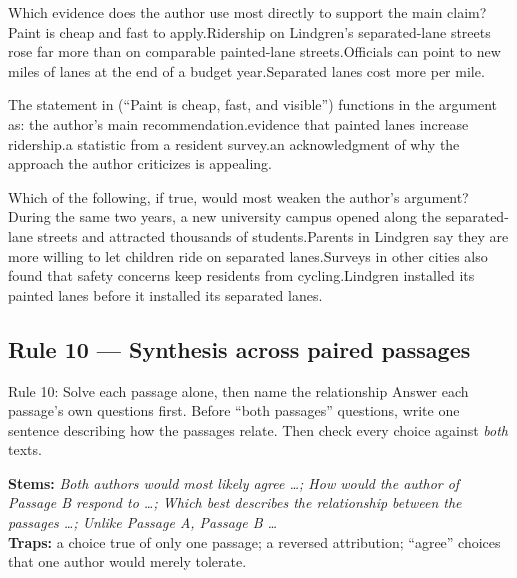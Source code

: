 \documentclass[11pt]{article}
\begin{document}
{Which evidence does the author use most directly to support the main claim?}
{Paint is cheap and fast to apply.}{Ridership on Lindgren's separated-lane streets rose far more than on comparable painted-lane streets.}{Officials can point to new miles of lanes at the end of a budget year.}{Separated lanes cost more per mile.}

{The statement in  (``Paint is cheap, fast, and visible'') functions in the argument as:}
{the author's main recommendation.}{evidence that painted lanes increase ridership.}{a statistic from a resident survey.}{an acknowledgment of why the approach the author criticizes is appealing.}

{Which of the following, if true, would most weaken the author's argument?}
{During the same two years, a new university campus opened along the separated-lane streets and attracted thousands of students.}{Parents in Lindgren say they are more willing to let children ride on separated lanes.}{Surveys in other cities also found that safety concerns keep residents from cycling.}{Lindgren installed its painted lanes before it installed its separated lanes.}

\subsection{Rule 10 --- Synthesis across paired passages}
\begin{rulebox}{Rule 10: Solve each passage alone, then name the relationship}
Answer each passage's own questions first. Before ``both passages'' questions, write one sentence describing how the passages relate. Then check every choice against \emph{both} texts.
\end{rulebox}
\textbf{Stems:} \emph{Both authors would most likely agree \dots; How would the author of Passage B respond to \dots; Which best describes the relationship between the passages \dots; Unlike Passage A, Passage B \dots}\\
\textbf{Traps:} a choice true of only one passage; a reversed attribution; ``agree'' choices that one author would merely tolerate.
\end{document}
